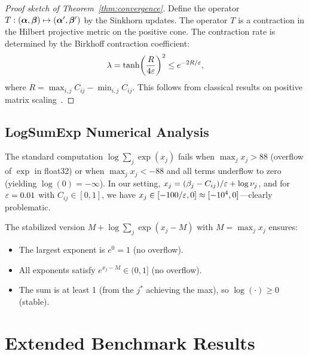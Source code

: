\begin{proof}[Proof sketch of Theorem~\ref{thm:convergence}]
Define the operator $T: (\bm{\alpha}, \bm{\beta}) \mapsto (\bm{\alpha}', \bm{\beta}')$ by the Sinkhorn updates. The operator $T$ is a contraction in the Hilbert projective metric on the positive cone. The contraction rate is determined by the Birkhoff contraction coefficient:
\begin{equation}
    \lambda = \tanh\!\left(\frac{R}{4\varepsilon}\right)^2 \leq e^{-2R/\varepsilon},
\end{equation}
where $R = \max_{i,j} C_{ij} - \min_{i,j} C_{ij}$. This follows from classical results on positive matrix scaling~\citep{franklin1989scaling}.
\end{proof}

\subsection{LogSumExp Numerical Analysis}

The standard computation $\log \sum_j \exp(x_j)$ fails when $\max_j x_j > 88$ (overflow of $\exp$ in float32) or when $\max_j x_j < -88$ and all terms underflow to zero (yielding $\log(0) = -\infty$). In our setting, $x_j = (\beta_j - C_{ij})/\varepsilon + \log \nu_j$, and for $\varepsilon = 0.01$ with $C_{ij} \in [0, 1]$, we have $x_j \in [-100/\varepsilon, 0] \approx [-10^4, 0]$---clearly problematic.

The stabilized version $M + \log \sum_j \exp(x_j - M)$ with $M = \max_j x_j$ ensures:
\begin{itemize}
    \item The largest exponent is $e^0 = 1$ (no overflow).
    \item All exponents satisfy $e^{x_j - M} \in (0, 1]$ (no overflow).
    \item The sum is at least 1 (from the $j^*$ achieving the max), so $\log(\cdot) \geq 0$ (stable).
\end{itemize}

\section{Extended Benchmark Results}
\label{app:benchmarks}


